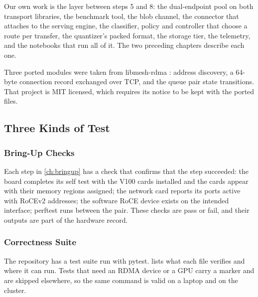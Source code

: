Our own work is the layer between steps 5 and 8: the dual-endpoint pool on
both transport libraries, the benchmark tool, the blob channel, the connector that attaches to the serving engine, the classifier, policy and controller
that choose a route per transfer, the quantizer's packed format, the storage
tier, the telemetry, and the notebooks that run all of it. The two preceding chapters describe each one.

Three ported modules were taken from libmesh-rdma \citep{libmesh}: address
discovery, a 64-byte connection record exchanged over TCP, and the queue pair
state transitions. That project is MIT licensed, which requires its notice to be kept with the ported files.

\subsection{Three Kinds of Test}
\label{sec:tests}

\subsubsection{Bring-Up Checks}

Each step in \cref{ch:bringup} has a check that confirms that the step succeeded: the
board completes its self test with the V100 cards installed and the cards
appear with their memory regions assigned; the network card reports its ports
active with RoCEv2 addresses; the software RoCE device exists on the intended
interface; perftest runs between the pair. These checks are pass or fail, and their
outputs are part of the hardware record.

\subsubsection{Correctness Suite}

The repository has a test suite run with pytest.  lists what
each file verifies and where it can run. Tests that need an RDMA device or a
GPU carry a marker and are skipped elsewhere, so the same command is valid on
a laptop and on the cluster.

